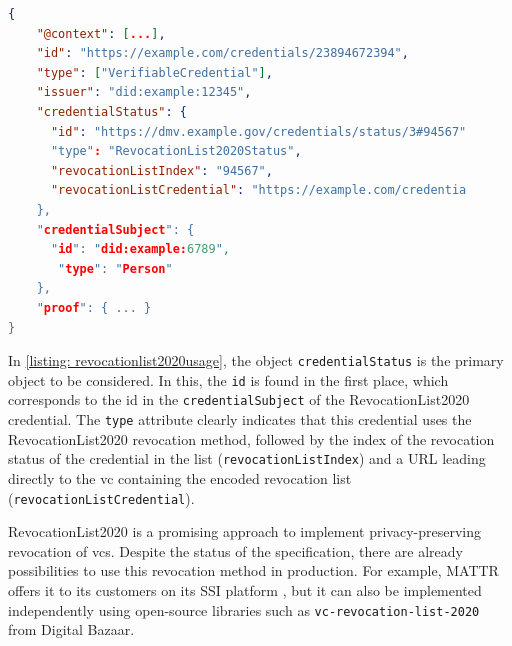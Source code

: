         \begin{lstlisting}[language=json, caption={Example \ac{vc} referencing a RevocationList2020 credential (edited and extracted from \cite{longley_revocation_2021})}, captionpos=b, label={listing: revocationlist2020usage}]  
{
    "@context": [...],
    "id": "https://example.com/credentials/23894672394", 
    "type": ["VerifiableCredential"],
    "issuer": "did:example:12345",
    "credentialStatus": {
      "id": "https://dmv.example.gov/credentials/status/3#94567"
      "type": "RevocationList2020Status",
      "revocationListIndex": "94567",
      "revocationListCredential": "https://example.com/credentia
    }, 
    "credentialSubject": {
      "id": "did:example:6789",
       "type": "Person"
    },
    "proof": { ... } 
}\end{lstlisting}
    
    In \ref{listing: revocationlist2020usage}, the object \texttt{credentialStatus} is the primary object to be considered. In this, the \texttt{id} is found in the first place, which corresponds to the id in the \texttt{credentialSubject} of the RevocationList2020 credential. The \texttt{type} attribute clearly indicates that this credential uses the RevocationList2020 revocation method, followed by the index of the revocation status of the credential in the list (\texttt{revocationListIndex}) and a URL leading directly to the \ac{vc} containing the encoded revocation list (\texttt{revocationListCredential}). \cite{longley_revocation_2021}
    
    RevocationList2020 is a promising approach to implement privacy-preserving revocation of \acp{vc}. Despite the status of the specification, there are already possibilities to use this revocation method in production. For example, MATTR offers it to its customers on its SSI platform \cite{mattr_adding_2020}, but it can also be implemented independently using open-source libraries such as \texttt{vc-revocation-list-2020} \cite{digital_bazaar_vc-revocation-list-2020_2021} from Digital Bazaar.